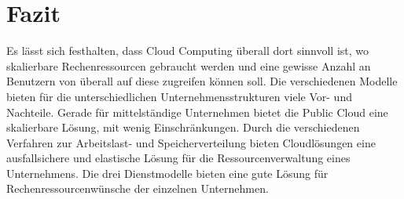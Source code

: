 \section{Fazit}
Es lässt sich festhalten, dass Cloud Computing überall dort sinnvoll ist, wo skalierbare Rechenressourcen gebraucht werden und eine gewisse Anzahl an Benutzern von überall auf diese zugreifen können soll.
Die verschiedenen Modelle bieten für die unterschiedlichen Unternehmensstrukturen viele Vor- und Nachteile. Gerade für mittelständige Unternehmen bietet die Public Cloud eine skalierbare Lösung, mit wenig Einschränkungen. Durch die verschiedenen Verfahren zur Arbeitslast- und Speicherverteilung bieten Cloudlösungen eine ausfallsichere und elastische Lösung für die Ressourcenverwaltung eines Unternehmens. Die drei Dienstmodelle bieten eine gute Lösung für Rechenressourcenwünsche der einzelnen Unternehmen.

